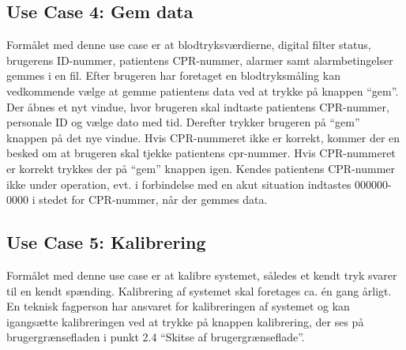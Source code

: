 \subsection{Use Case 4: Gem data}
Formålet med denne use case er at blodtryksværdierne, digital filter status, brugerens ID-nummer, patientens CPR-nummer, alarmer samt alarmbetingelser gemmes i en fil. Efter brugeren har foretaget en blodtryksmåling kan vedkommende vælge at gemme patientens data ved at trykke på knappen “gem”. Der åbnes et nyt vindue, hvor brugeren skal indtaste patientens CPR-nummer, personale ID og vælge dato med tid. Derefter trykker brugeren på “gem” knappen på det nye vindue. Hvis CPR-nummeret ikke er korrekt, kommer der en besked om at brugeren skal tjekke patientens cpr-nummer. Hvis CPR-nummeret er korrekt trykkes der på “gem” knappen igen. Kendes patientens CPR-nummer ikke under operation, evt. i forbindelse med en akut situation indtastes 000000-0000 i stedet for CPR-nummer, når der gemmes data.

\subsection{Use Case 5: Kalibrering}
Formålet med denne use case er at kalibre systemet, således et kendt tryk svarer til en kendt spænding. Kalibrering af systemet skal foretages ca. én gang årligt. En teknisk fagperson har ansvaret for kalibreringen af systemet og kan igangsætte kalibreringen ved at trykke på knappen kalibrering, der ses på brugergrænsefladen i punkt 2.4 “Skitse af brugergrænseflade”. 
